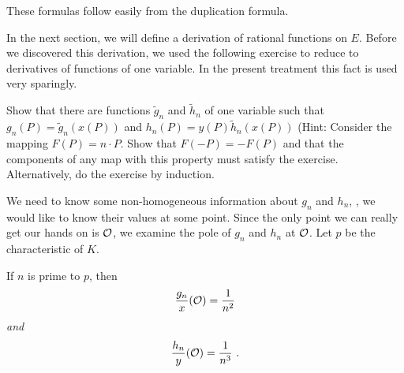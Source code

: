 These formulas follow easily from the duplication formula.

In the next section, we will define a derivation of rational functions on $E$. Before we discovered this derivation, we used the following exercise to reduce to derivatives of functions of one variable. In the present treatment this fact is used very sparingly.

\begin{exo}
\label{e7.5}
Show that there are functions $\tilde{g}_{n}$ and $\tilde{h}_{n}$ of one variable such that $g_{n}(P)=\tilde{g}_{n}(x(P))$ and $h_{n}(P)=y(P)\tilde{h}_{n}(x(P))$ (Hint: Consider the mapping $F(P)=n\cdot P$. Show that $F(-P)=-F(P)$ and that the components of any map with this property must satisfy the exercise. Alternatively, do the exercise by induction.
\end{exo}

We need to know some non-homogeneous information about $g_{n}$ and $h_{n}$, \ie, we would like to know their values at some point. Since the only point we can really get our hands on is $\mathcal{O}$, we examine the pole of $g_{n}$ and $h_{n}$ at $\mathcal{O}$. Let $p$ be the characteristic of $K$.

\begin{prop}
\label{p7.6}
If $n$ is prime to $p$, then
$$
\frac{g_{n}}{x}(\mathcal{O})=\frac{1}{n^{2}}
$$
{\it and}
$$
\frac{h_{n}}{y}(\cuz)=\frac{1}{n^{3}}\ .
$$
\end{prop}

